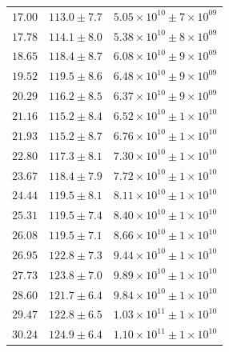 \documentclass{article}
\begin{document}
\begin{table}[h!]
\begin{tabular}{|c|c|c|}
        $17.00$ & $113.0 \pm 7.7$ & $5.05\times 10^{10} \pm 7\times 10^{09}$ \\
        $17.78$ & $114.1 \pm 8.0$ & $5.38\times 10^{10} \pm 8\times 10^{09}$ \\
        $18.65$ & $118.4 \pm 8.7$ & $6.08\times 10^{10} \pm 9\times 10^{09}$ \\
        $19.52$ & $119.5 \pm 8.6$ & $6.48\times 10^{10} \pm 9\times 10^{09}$ \\
        $20.29$ & $116.2 \pm 8.5$ & $6.37\times 10^{10} \pm 9\times 10^{09}$ \\
        $21.16$ & $115.2 \pm 8.4$ & $6.52\times 10^{10} \pm 1\times 10^{10}$ \\
        $21.93$ & $115.2 \pm 8.7$ & $6.76\times 10^{10} \pm 1\times 10^{10}$ \\
        $22.80$ & $117.3 \pm 8.1$ & $7.30\times 10^{10} \pm 1\times 10^{10}$ \\
        $23.67$ & $118.4 \pm 7.9$ & $7.72\times 10^{10} \pm 1\times 10^{10}$ \\
        $24.44$ & $119.5 \pm 8.1$ & $8.11\times 10^{10} \pm 1\times 10^{10}$ \\
        $25.31$ & $119.5 \pm 7.4$ & $8.40\times 10^{10} \pm 1\times 10^{10}$ \\
        $26.08$ & $119.5 \pm 7.1$ & $8.66\times 10^{10} \pm 1\times 10^{10}$ \\
        $26.95$ & $122.8 \pm 7.3$ & $9.44\times 10^{10} \pm 1\times 10^{10}$ \\
        $27.73$ & $123.8 \pm 7.0$ & $9.89\times 10^{10} \pm 1\times 10^{10}$ \\
        $28.60$ & $121.7 \pm 6.4$ & $9.84\times 10^{10} \pm 1\times 10^{10}$ \\
        $29.47$ & $122.8 \pm 6.5$ & $1.03\times 10^{11} \pm 1\times 10^{10}$ \\
        $30.24$ & $124.9 \pm 6.4$ & $1.10\times 10^{11} \pm 1\times 10^{10}$ \\
        \hline
    \end{tabular}
\end{table}
\end{document}
